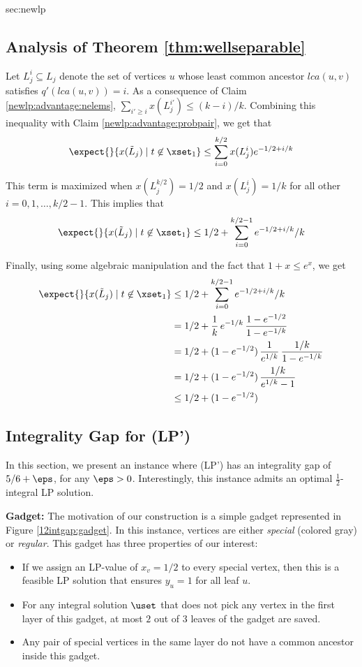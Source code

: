 \begin{appendixextra}{sec:newlp}{\subsection{Analysis of Theorem \ref{thm:wellseparable}}}
Let $L^i_j \subseteq L_j$ denote the set of vertices $u$ whose least common ancestor $lca(u,v)$ satisfies $q'(lca(u,v)) = i$.
As a consequence of Claim \ref{newlp:advantage:nelems}, $\sum_{i' \geq i} x(L^{i'}_j) \leq (k-i)/k$.  
Combining this inequality with Claim \ref{newlp:advantage:probpair}, we get that
\[\expect{}{x(\tilde L_j) \mid t \not \in \xset_1} \leq \sum_{i=0}^{k/2} x(L_j^i) e^{-1/2+i/k}\]

This term is maximized when $x(L_j^{k/2}) =1/2$ and $x(L_j^i) = 1/k$ for all other $i=0,1,\ldots, k/2-1$. 
This implies that 
\[\expect{}{x(\tilde L_j) \mid t \not \in \xset_1} \leq 1/2 + \sum_{i=0}^{k/2-1} e^{-1/2+i/k}/k\]

Finally, using some algebraic manipulation and the fact that $1+x \leq e^x$, we get  
\begin{align*}
\expect{}{x(\tilde L_j) \mid t \not \in \xset_1} 
&\leq 1/2 + \sum_{i=0}^{k/2-1} e^{-1/2+i/k}/k \\
&= 1/2 + \frac{1}{k}\, e^{-1/k}\,\frac{1-e^{-1/2}}{1-e^{-1/k}} \\
&= 1/2 + (1-e^{-1/2})\, \frac1{e^{1/k}}\, \frac{1/k}{1-e^{-1/k}} \\
&= 1/2 + (1-e^{-1/2})\, \frac{1/k}{e^{1/k}-1} \\
&\leq 1/2 + (1-e^{-1/2})
\end{align*}

\end{appendixextra}


\subsection{Integrality Gap for (LP')}
\label{sec:gap-newlp}  
In this section, we present an instance where (LP') has an integrality gap of
$5/6+\eps$, for any $\eps > 0$.
Interestingly, this instance admits an optimal $\frac{1}{2}$-integral LP solution.  

{\bf Gadget:}
The motivation of our construction is a simple gadget represented in
Figure \ref{12intgap:gadget}. 
In this instance, vertices are either {\em special} (colored gray) or {\em regular}. 
This gadget has three properties of our interest: 

\begin{itemize}

\item If we assign an LP-value of $x_v= 1/2$ to every special vertex, then this is a feasible LP solution that ensures $y_u = 1$ for all leaf $u$.  

\item For any integral solution $\uset$ that does not pick any vertex in the first layer of this gadget, at most $2$ out of $3$ leaves of the gadget are saved. 

\item Any pair of special vertices in the same layer do not have a common ancestor inside this gadget. 

\end{itemize}


